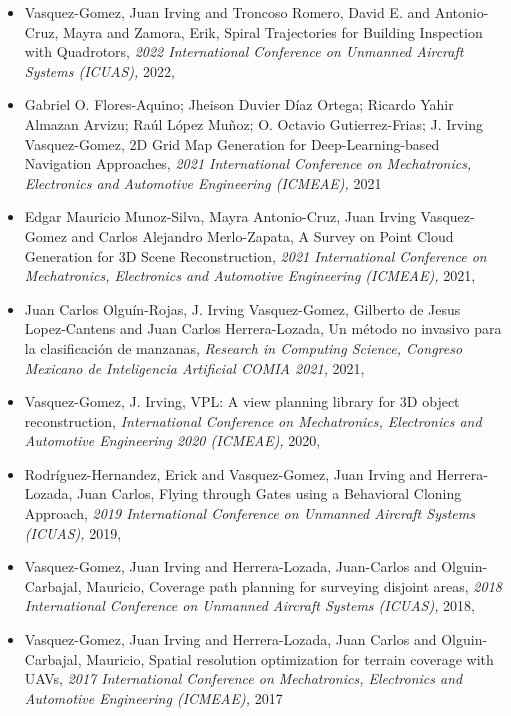 \begin{itemize} 
\item Vasquez-Gomez, Juan Irving and Troncoso Romero, David E. and Antonio-Cruz, Mayra and Zamora, Erik, Spiral Trajectories for Building Inspection with Quadrotors, \textit{ 2022 International Conference on Unmanned Aircraft Systems (ICUAS),} 2022, \href{https://doi.org/10.1109/ICUAS54217.2022.9836133} {\faFilePdfO} 
\item Gabriel O. Flores-Aquino; Jheison Duvier Díaz Ortega; Ricardo Yahir Almazan Arvizu; Raúl López Muñoz; O. Octavio Gutierrez-Frias; J. Irving Vasquez-Gomez, 2D Grid Map Generation for Deep-Learning-based Navigation Approaches, \textit{ 2021 International Conference on Mechatronics, Electronics and Automotive Engineering (ICMEAE),} 2021 
\item Edgar Mauricio Munoz-Silva, Mayra Antonio-Cruz, Juan Irving Vasquez-Gomez and Carlos Alejandro Merlo-Zapata, A Survey on Point Cloud Generation for 3D Scene Reconstruction, \textit{ 2021 International Conference on Mechatronics, Electronics and Automotive Engineering (ICMEAE),} 2021, \href{10.1109/ICMEAE55138.2021.00021} {\faFilePdfO} 
\item Juan Carlos Olguín-Rojas, J. Irving Vasquez-Gomez, Gilberto de Jesus Lopez-Cantens and Juan Carlos Herrera-Lozada, Un método no invasivo para la clasificación de manzanas, \textit{ Research in Computing Science, Congreso Mexicano de Inteligencia Artificial COMIA 2021,} 2021, \href{} {\faFilePdfO} 
\item Vasquez-Gomez, J. Irving, VPL: A view planning library for 3D object reconstruction, \textit{ International Conference on Mechatronics, Electronics and Automotive Engineering 2020 (ICMEAE),} 2020, \href{https://doi.org/10.1109/ICMEAE51770.2020.00010} {\faFilePdfO} 
\item Rodríguez-Hernandez, Erick and Vasquez-Gomez, Juan Irving and Herrera-Lozada, Juan Carlos, Flying through Gates using a Behavioral Cloning Approach, \textit{ 2019 International Conference on Unmanned Aircraft Systems (ICUAS),} 2019, \href{https://doi.org/10.1109/ICUAS.2019.8798172} {\faFilePdfO} 
\item Vasquez-Gomez, Juan Irving and Herrera-Lozada, Juan-Carlos and Olguin-Carbajal, Mauricio, Coverage path planning for surveying disjoint areas, \textit{ 2018 International Conference on Unmanned Aircraft Systems (ICUAS),} 2018, \href{https://doi.org/10.1109/ICUAS.2018.8453386} {\faFilePdfO} 
\item Vasquez-Gomez, Juan Irving and Herrera-Lozada, Juan Carlos and Olguin-Carbajal, Mauricio, Spatial resolution optimization for terrain coverage with UAVs, \textit{ 2017 International Conference on Mechatronics, Electronics and Automotive Engineering (ICMEAE),} 2017 

\end{itemize}

